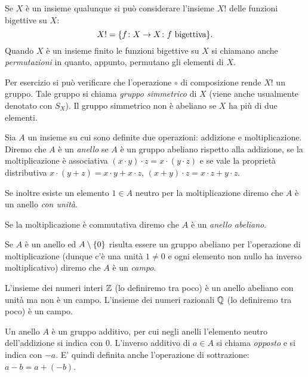 \begin{example}
  Se $X$ è un insieme qualunque si può considerare l'insieme
  $X!$ delle funzioni bigettive su $X$:
  \[
    X! = {\left\{ f\colon X\to X\colon f \text{ bigettiva} \right\}}.
  \]
  Quando $X$ è un insieme finito le funzioni bigettive su $X$ si chiamano 
  anche \emph{permutazioni} in quanto, appunto, permutano gli elementi di $X$.

  Per esercizio si può verificare che l'operazione $\circ$ di composizione 
  rende $X!$ un gruppo.
  Tale gruppo si chiama \emph{gruppo simmetrico} di $X$ 
  (viene anche usualmente denotato con $S_X$).
  Il gruppo simmetrico non è abeliano se $X$ ha più di due elementi.
\end{example}

\begin{definition}
  \label{def:anello}%
  \label{def:campo}%
  Sia $A$ un insieme su cui sono definite due operazioni: 
  addizione e moltiplicazione.  
  Diremo che $A$ è un \emph{anello} se $A$ è un gruppo abeliano rispetto alla 
  addizione, 
  se la moltiplicazione è associativa $(x\cdot y)\cdot z = x\cdot (y\cdot z)$ 
  e se vale la proprietà distributiva $x\cdot(y+z) = x\cdot y + x\cdot z$,
  $(x+y)\cdot z = x\cdot z + y\cdot z$.

  Se inoltre esiste un elemento $1\in A$ neutro per la moltiplicazione 
  diremo che $A$ è un anello \emph{con unità}.

  Se la moltiplicazione è commutativa diremo che $A$ è un \emph{anello abeliano}.

  Se $A$ è un anello ed $A\setminus {\left\{ 0 \right\}}$ risulta essere un gruppo abeliano
  per l'operazione di moltiplicazione 
  (dunque c'è una unità $1\neq 0$ e ogni elemento non nullo ha inverso moltiplicativo)
  diremo che $A$ è un \emph{campo}.
\end{definition}

\begin{example}
  L'insieme dei numeri interi ${\mathbb Z}$ (lo definiremo tra poco) è un anello abeliano con unità
  ma non è un campo.
  L'insieme dei numeri razionali ${\mathbb Q}$ (lo definiremo tra poco) è un campo.
\end{example}

Un anello $A$ è un gruppo additivo, per cui negli anelli l'elemento neutro 
dell'addizione si indica con $0$. 
L'inverso additivo di $a\in A$ si chiama \emph{opposto} e si indica con $-a$.
E' quindi definita anche l'operazione di sottrazione: $a-b = a+(-b)$.


